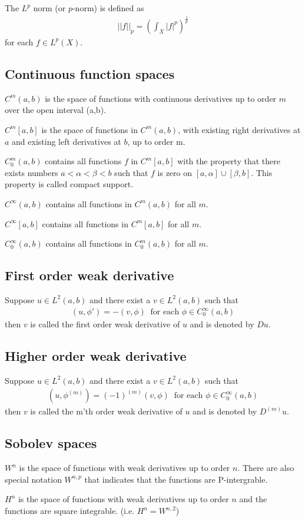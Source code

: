 \documentclass[main.tex]{subfiles}
\begin{document}
The \( L^p \) norm (or \( p \)-norm) is defined as
\begin{eqnarray*}
    ||f||_p = \left( \int_X |f|^p \right)^{\frac{1}{p}}
\end{eqnarray*}
for each \( f \in L^p(X) \).

\subsection*{Continuous function spaces}
$C^m(a,b)$ is the space of functions with continuous derivatives up to order $m$ over the open interval (a,b).

$C^m[a,b]$ is the space of functions in $C^m(a,b)$, with existing right derivatives at $a$ and existing left derivatives at $b$, up to order m.

$C_0^m(a,b)$ contains all functions $f$ in $C^m[a,b]$ with the property that there exists numbers $a < \alpha < \beta < b$ such that $f$ is zero on $[a,\alpha] \cup [\beta, b]$. This property is called compact support.

$C^\infty(a,b)$ contains all functions in $C^m(a,b)$ for all $m$.

$C^\infty[a,b]$ contains all functions in $C^m[a,b]$ for all $m$.

$C_0^\infty(a,b)$ contains all functions in $C_0^m(a,b)$ for all $m$.


\subsection*{First order weak derivative}
Suppose $u \in L^2(a,b)$ and there exist a $v \in L^2(a,b)$ such that
\begin{eqnarray*}
	(u,\phi') = -(v,\phi) \ \textrm{ for each } \phi \in C^{\infty}_0(a,b)
\end{eqnarray*}
then $v$ is called the first order weak derivative of $u$ and is denoted by $Du$.

\subsection*{Higher order weak derivative}
Suppose $u \in L^2(a,b)$ and there exist a $v \in L^2(a,b)$ such that
\begin{eqnarray*}
	(u,\phi^{(m)}) = (-1)^{(m)}(v,\phi) \ \textrm{ for each } \phi \in C^{\infty}_0(a,b)
\end{eqnarray*}
then $v$ is called the m'th order weak derivative of $u$ and is denoted by $D^{(m)}u$.

\subsection*{Sobolev spaces}

$W^n$ is the space of functions with weak derivatives up to order $n$. There are also special notation $W^{n,p}$ that indicates that the functions are P-intergrable. 

$H^n$ is the space of functions with weak derivatives up to order $n$ and the functions are square integrable. (i.e. $H^n = W^{n,2}$)
\end{document}

